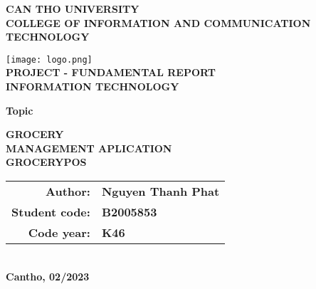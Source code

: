 \documentclass[../thesis.tex]{subfiles}
\begin{document}
\begin{titlepage}

\begin{center}

\textbf{CAN THO UNIVERSITY\\}
\textbf{COLLEGE OF INFORMATION AND COMMUNICATION TECHNOLOGY\\[2cm]}

\texttt{[image: logo.png]}\\[1cm]

\textbf{ PROJECT - FUNDAMENTAL REPORT\\}
\textbf{INFORMATION TECHNOLOGY\\[1.5cm]}

\begin{large}
\textbf{Topic\\[0.5cm]}
\end{large}
\textbf{{\LARGE GROCERY\\MANAGEMENT APLICATION\\[0.4cm]GROCERYPOS}}
\\[3.5cm]

\begin{tabular}{ r l }
\textbf{Author:} & \textbf{Nguyen Thanh Phat}\\ 
\textbf{Student code:} & \textbf{B2005853}\\  
\textbf{Code year:} & \textbf{K46}   
\end{tabular}
\\[4cm]

\textbf{Cantho, 02/2023}

\end{center}

\end{titlepage}
\end{document}
